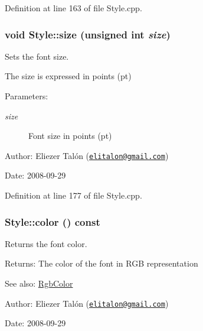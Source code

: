 Definition at line 163 of file Style.cpp.\hypertarget{class_style_9ef3273bd0c0558d7203a87ac26cf4d2}{
\subsubsection[size]{\setlength{\rightskip}{0pt plus 5cm}void Style::size (unsigned int {\em size})}}
\label{class_style_9ef3273bd0c0558d7203a87ac26cf4d2}


Sets the font size. 

The size is expressed in points (pt)

\begin{Desc}
\item[Parameters:]
\begin{description}
\item[{\em size}]Font size in points (pt)\end{description}
\end{Desc}
\begin{Desc}
\item[Author:]Eliezer Talón (\href{mailto:elitalon@gmail.com}{\tt elitalon@gmail.com}) \end{Desc}
\begin{Desc}
\item[Date:]2008-09-29 \end{Desc}


Definition at line 177 of file Style.cpp.\hypertarget{class_style_71b938a521e8c6e30926ddb3d0aa83b3}{
\subsubsection[color]{ Style::color () const}}
\label{class_style_71b938a521e8c6e30926ddb3d0aa83b3}


Returns the font color. 

\begin{Desc}
\item[Returns:]The color of the font in RGB representation\end{Desc}
\begin{Desc}
\item[See also:]\hyperlink{struct_rgb_color}{RgbColor}\end{Desc}
\begin{Desc}
\item[Author:]Eliezer Talón (\href{mailto:elitalon@gmail.com}{\tt elitalon@gmail.com}) \end{Desc}
\begin{Desc}
\item[Date:]2008-09-29 \end{Desc}


